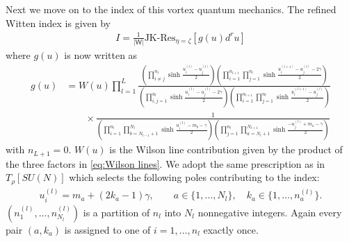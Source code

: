 \documentclass[a4paper,11pt]{article}
\begin{document}
Next we move on to the index of this vortex quantum mechanics. The refined Witten index is given by
\begin{align}
\label{eq:N=2 ind}
I = \frac{1}{|\mathsf W|} \text{JK-Res}_{\eta = \zeta} \left[g(u) d^r u\right]
\end{align}
where $g(u)$ is now written as
\begin{align}
\label{eq:N=2 1-loop}
%
g(u) &= W(u) \prod_{l = 1}^L \frac{\left(\prod_{i \neq j}^{n_l} \sinh \frac{u^{(l)}_i-u^{(l)}_j}{2}\right) \left(\prod_{i = 1}^{n_{l+1}} \prod_{j = 1}^{n_l} \sinh \frac{u^{(l+1)}_i-u^{(l)}_j-2 \gamma}{2}\right)}{\left(\prod_{i,j = 1}^{n_l} \sinh \frac{u^{(l)}_i-u^{(l)}_j-2 \gamma}{2}\right) \left(\prod_{i = 1}^{n_{l+1}} \prod_{j = 1}^{n_l} \sinh \frac{u^{(l+1)}_i-u^{(l)}_j}{2}\right)} \nonumber \\
%
&\qquad \times \frac{1}{\left(\prod_{i = 1}^{n_l} \prod_{b = N_{l-1}+1}^{N_l} \sinh \frac{u^{(l)}_i-m_b-\gamma}{2}\right) \left(\prod_{j = 1}^{n_l} \prod_{a = N_l+1}^{N_{l+1}} \sinh \frac{-u^{(l)}_j+m_a-\gamma}{2}\right)}
%
\end{align}
with $n_{L+1} = 0$. $W(u)$ is the Wilson line contribution given by the product of the three factors in \eqref{eq:Wilson lines}. We adopt the same prescription as in $T_\rho [SU(N)]$ which selects the following poles contributing to the index:
\begin{align}
u^{(l)}_i = m_a+(2 k_a-1) \gamma, \qquad a \in \{1,\ldots,N_l\}, \quad k_a \in \{1,\ldots,n^{(l)}_a\}.
\end{align}
$(n^{(l)}_1,\ldots,n^{(l)}_{N_l})$ is a partition of $n_l$ into $N_l$ nonnegative integers. Again every pair $(a,k_a)$ is assigned to one of $i = 1,\ldots,n_l$ exactly once.
\end{document}
